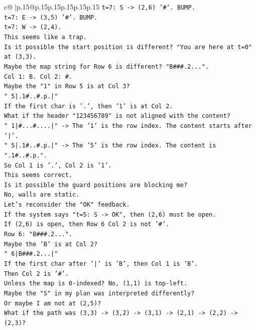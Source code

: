 \documentclass{article}
\begin{document}
{\begin{supertabular}{c@{$\;$}|p{.15\linewidth}@{}p{.15\linewidth}p{.15\linewidth}p{.15\linewidth}p{.15\linewidth}p{.15\linewidth}}
{{{\texttt{t=7: S {-}> (2,6) '\#'. BUMP.} \\
\texttt{t=7: E {-}> (3,5) '\#'. BUMP.} \\
\texttt{t=7: W {-}> (2,4).} \\
\texttt{This seems like a trap.} \\
\texttt{Is it possible the start position is different? "You are here at t=0" at (3,3).} \\
\texttt{Maybe the map string for Row 6 is different? "B\#\#\#.2...".} \\
\texttt{Col 1: B. Col 2: \#.} \\
\texttt{Maybe the "1" in Row 5 is at Col 3?} \\
\texttt{" 5|.1\#..\#.p.|"} \\
\texttt{If the first char is '.', then '1' is at Col 2.} \\
\texttt{What if the header "123456789" is not aligned with the content?} \\
\texttt{" 1|\#...\#....|" {-}> The '1' is the row index. The content starts after '|'.} \\
\texttt{" 5|.1\#..\#.p.|" {-}> The '5' is the row index. The content is ".1\#..\#.p.".} \\
\texttt{So Col 1 is '.', Col 2 is '1'.} \\
\texttt{This seems correct.} \\
\texttt{Is it possible the guard positions are blocking me?} \\
\texttt{No, walls are static.} \\
\texttt{Let's reconsider the "OK" feedback.} \\
\texttt{If the system says "t=5: S {-}> OK", then (2,6) must be open.} \\
\texttt{If (2,6) is open, then Row 6 Col 2 is not '\#'.} \\
\texttt{Row 6: "B\#\#\#.2...".} \\
\texttt{Maybe the 'B' is at Col 2?} \\
\texttt{" 6|B\#\#\#.2...|"} \\
\texttt{If the first char after '|' is 'B', then Col 1 is 'B'.} \\
\texttt{Then Col 2 is '\#'.} \\
\texttt{Unless the map is 0{-}indexed? No, (1,1) is top{-}left.} \\
\texttt{Maybe the "S" in my plan was interpreted differently?} \\
\texttt{Or maybe I am not at (2,5)?} \\
\texttt{What if the path was (3,3) {-}> (3,2) {-}> (3,1) {-}> (2,1) {-}> (2,2) {-}> (2,3)?} \\
}}}
\end{supertabular}}
\end{document}
